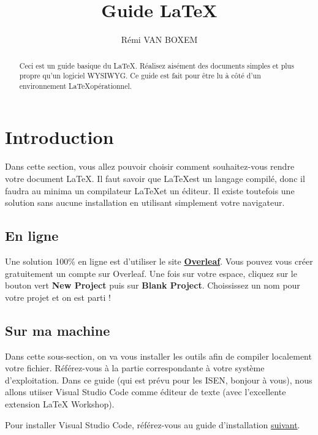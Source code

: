 \documentclass[A4paper
]{article}
\title{Guide \LaTeX}
\author{Rémi VAN BOXEM}
\begin{document}
\maketitle
\begin{abstract}
Ceci est un guide basique du \LaTeX. Réalisez aisément des documents
simples et plus propre qu'un logiciel WYSIWYG. Ce guide est fait pour
être lu à côté d'un environnement \LaTeX opérationnel.
\end{abstract}

{
\setcounter{tocdepth}{3}
\tableofcontents
}
\hypertarget{introduction}{%
\section{Introduction}\label{introduction}}

Dans cette section, vous allez pouvoir choisir comment souhaitez-vous
rendre votre document \LaTeX. Il faut savoir que \LaTeX est un langage
compilé, donc il faudra au minima un compilateur \LaTeX et un éditeur. Il
existe toutefois une solution sans aucune installation en utilisant
simplement votre navigateur.

\hypertarget{en-ligne}{%
\subsection{En ligne}\label{en-ligne}}

Une solution 100\% en ligne est d'utiliser le site
\textbf{\href{https://www.overleaf.com/}{Overleaf}}. Vous pouvez vous
créer gratuitement un compte sur Overleaf. Une fois sur votre espace,
cliquez sur le bouton vert \textbf{New Project} puis sur \textbf{Blank
Project}. Choississez un nom pour votre projet et on est parti !

\hypertarget{sur-ma-machine}{%
\subsection{Sur ma machine}\label{sur-ma-machine}}

Dans cette sous-section, on va vous installer les outils afin de
compiler localement votre fichier. Référez-vous à la partie
correspondante à votre système d'exploitation. Dans ce guide (qui est
prévu pour les ISEN, bonjour à vous), nous allons utiiser Visual Studio
Code comme éditeur de texte (avec l'excellente extension \LaTeX
Workshop).

Pour installer Visual Studio Code, référez-vous au guide d'installation
\href{https://code.visualstudio.com/docs/setup/}{suivant}.
\end{document}
